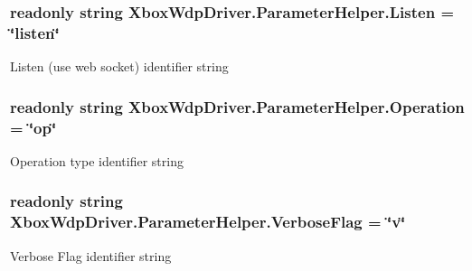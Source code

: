 \subsubsection[{\texorpdfstring{Listen}{Listen}}]{\setlength{\rightskip}{0pt plus 5cm}readonly string Xbox\+Wdp\+Driver.\+Parameter\+Helper.\+Listen = \char`\"{}listen\char`\"{}\hspace{0.3cm}{\ttfamily [static]}}\hypertarget{class_xbox_wdp_driver_1_1_parameter_helper_a831c1ff817ac381e9dbd2802ea96ad81}{}\label{class_xbox_wdp_driver_1_1_parameter_helper_a831c1ff817ac381e9dbd2802ea96ad81}


Listen (use web socket) identifier string 

\subsubsection[{\texorpdfstring{Operation}{Operation}}]{\setlength{\rightskip}{0pt plus 5cm}readonly string Xbox\+Wdp\+Driver.\+Parameter\+Helper.\+Operation = \char`\"{}op\char`\"{}\hspace{0.3cm}{\ttfamily [static]}}\hypertarget{class_xbox_wdp_driver_1_1_parameter_helper_a3f7664000cb974494e187ee1a571e624}{}\label{class_xbox_wdp_driver_1_1_parameter_helper_a3f7664000cb974494e187ee1a571e624}


Operation type identifier string 

\subsubsection[{\texorpdfstring{Verbose\+Flag}{VerboseFlag}}]{\setlength{\rightskip}{0pt plus 5cm}readonly string Xbox\+Wdp\+Driver.\+Parameter\+Helper.\+Verbose\+Flag = \char`\"{}v\char`\"{}\hspace{0.3cm}{\ttfamily [static]}}\hypertarget{class_xbox_wdp_driver_1_1_parameter_helper_ab416a1b0e7eb1595ce658b44772a4a01}{}\label{class_xbox_wdp_driver_1_1_parameter_helper_ab416a1b0e7eb1595ce658b44772a4a01}


Verbose Flag identifier string 

